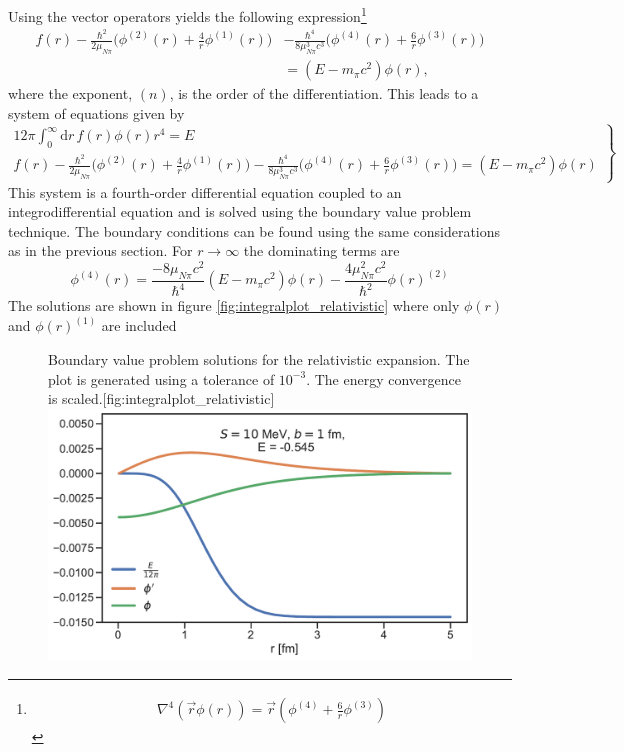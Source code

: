 Using the vector operators yields the following expression\footnote{\begin{align*}
		\nabla^4(\vec{r}\phi(r))=\vec{r}\left(\phi^{(4)}+\frac{6}{r}\phi^{(3)}\right)
\end{align*}}
\begin{equation}\begin{split}
	f(r)-\frac{\hbar^2}{2\mu_{N\pi}}\bigg( \phi^{(2)}(r)+\frac{4}{r}\phi^{(1)}(r) \bigg)&-\frac{\hbar^4}{8\mu_{N\pi}^3 c^3}\bigg(\phi^{(4)}(r)+\frac{6}{r}\phi^{(3)}(r)\bigg) \\
	&=(E-m_\pi c^2)\phi(r),
\end{split}
\end{equation}
where the exponent, $(n)$, is the order of the differentiation. This leads to a system of equations given by
\begin{equation}\label{systemrel}
	\left.
	\begin{array}{ll}
		12\pi \int_0^\infty  \text{d}r \, f(r) \phi(r) r^4  = E \\
		f(r)-\frac{\hbar^2}{2\mu_{N\pi}}\big( \phi^{(2)}(r)+\frac{4}{r}\phi^{(1)}(r) \big)-\frac{\hbar^4}{8\mu_{N\pi}^3 c^3}\big(\phi^{(4)}(r)+\frac{6}{r}\phi^{(3)}(r)\big)=(E-m_\pi c^2)\phi(r)
	\end{array}
	\right \} 
\end{equation}
This system is a fourth-order differential equation coupled to an integrodifferential equation and is solved using the boundary value problem technique. The boundary conditions can be found using the same considerations as in the previous section. For $r\rightarrow \infty$ the dominating terms are 
\begin{equation}
	\phi^{(4)}(r) = \frac{-8\mu_{N\pi}c^2}{\hbar^4}(E-m_\pi c^2)\phi(r)-\frac{4\mu^2_{N\pi}c^2}{\hbar^2}\phi(r)^{(2)}
\end{equation}
The solutions are shown in figure \ref{fig:integralplot_relativistic} where only $\phi(r)$ and $\phi(r)^{(1)}$ are included
\begin{figure}[H]
	\begin{sidecaption}{Boundary value problem solutions for the relativistic expansion. The plot is generated using a tolerance of $10^{-3}$. The energy convergence is scaled.}[fig:integralplot_relativistic]
		\includegraphics[width=\linewidth]{Figures/Integralplot_relativistic.pdf}
	\end{sidecaption}
\end{figure}
